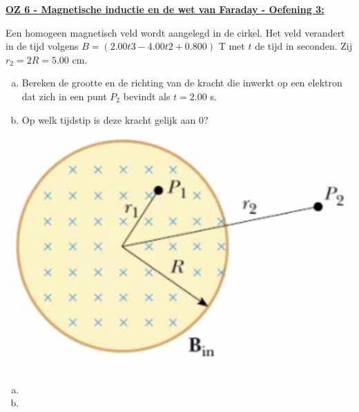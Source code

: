 \textbf{\underline{OZ 6 - Magnetische inductie en de wet van Faraday - Oefening 3:}}
\vspace{0.5cm}

    \begin{minipage}{.7\textwidth}
        Een homogeen magnetisch veld wordt aangelegd in de cirkel. Het veld verandert in de tijd volgens $B = (2.00t3 - 4.00t2 +0.800) $ T met $t$ de tijd in seconden. Zij $r_2 = 2R = 5.00$ cm.

        \begin{enumerate}[(a)]
            \item Bereken de grootte en de richting van de kracht die inwerkt op een elektron dat zich in een punt $P_2$ bevindt als $t = 2.00$ s.
            \item Op welk tijdstip is deze kracht gelijk aan $0$?
        \end{enumerate}    
    \end{minipage}
    \hspace{0.5cm}\begin{minipage}{.2\textwidth}
        \includegraphics[scale = 0.22]{oz06/resources/Oz6Oef3.png}
    \end{minipage}

    \begin{enumerate}[(a)]
        \item     
            \begin{description}[labelwidth=1.5cm, leftmargin=!]
                \item[Geg. :]
                \item[Gevr. :] 
                \item[Opl. :]
            \end{description}
        \item     
            \begin{description}[labelwidth=1.5cm, leftmargin=!]
                \item[Geg. :]
                \item[Gevr. :] 
                \item[Opl. :]
            \end{description}
    \end{enumerate}



\vspace{1cm}